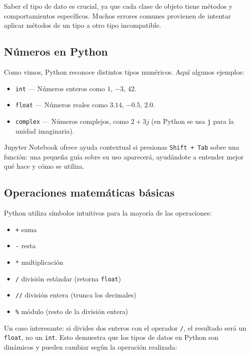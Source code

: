 \documentclass{article}
\theoremstyle{nonumberplain}
\begin{document}
Saber el tipo de dato es crucial, ya que cada clase de objeto tiene métodos y comportamientos específicos. Muchos errores comunes provienen de intentar aplicar métodos de un tipo a otro tipo incompatible.

\subsection*{Números en Python}

Como vimos, Python reconoce distintos tipos numéricos. Aquí algunos ejemplos:

\begin{itemize}
    \item \texttt{int} — Números enteros como $1$, $-3$, $42$.
    \item \texttt{float} — Números reales como $3.14$, $-0.5$, $2.0$.
    \item \texttt{complex} — Números complejos, como $2 + 3j$ (en Python se usa \texttt{j} para la unidad imaginaria).
\end{itemize}

Jupyter Notebook ofrece ayuda contextual si presionas \texttt{Shift + Tab} sobre una función: una pequeña guía sobre su uso aparecerá, ayudándote a entender mejor qué hace y cómo se utiliza.

\subsection*{Operaciones matemáticas básicas}

Python utiliza símbolos intuitivos para la mayoría de las operaciones:

\begin{itemize}
    \item \texttt{+} suma
    \item \texttt{-} resta
    \item \texttt{*} multiplicación
    \item \texttt{/} división estándar (retorna \texttt{float})
    \item \texttt{//} división entera (trunca los decimales)
    \item \texttt{\%} módulo (resto de la división entera)
\end{itemize}

Un caso interesante: si divides dos enteros con el operador \texttt{/}, el resultado será un \texttt{float}, no un \texttt{int}. Esto demuestra que los tipos de datos en Python son dinámicos y pueden cambiar según la operación realizada:
\end{document}
